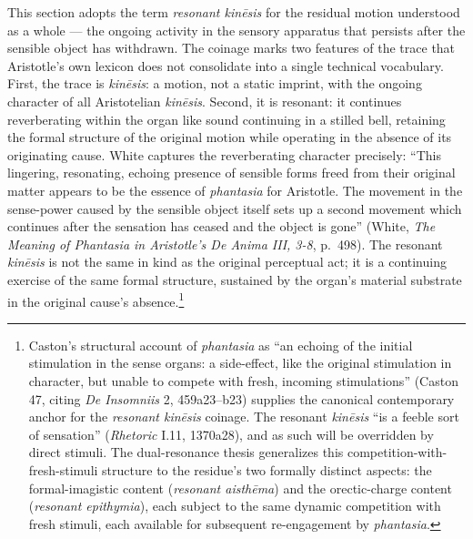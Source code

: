 \documentclass{article}
\begin{document}
This section adopts the term \textit{resonant kinēsis} for the residual motion understood as a whole --- the ongoing activity in the sensory apparatus that persists after the sensible object has withdrawn. The coinage marks two features of the trace that Aristotle's own lexicon does not consolidate into a single technical vocabulary. First, the trace is \textit{kinēsis}: a motion, not a static imprint, with the ongoing character of all Aristotelian \textit{kinēsis}. Second, it is resonant: it continues reverberating within the organ like sound continuing in a stilled bell, retaining the formal structure of the original motion while operating in the absence of its originating cause. White captures the reverberating character precisely: ``This lingering, resonating, echoing presence of sensible forms freed from their original matter appears to be the essence of \textit{phantasia} for Aristotle. The movement in the sense-power caused by the sensible object itself sets up a second movement which continues after the sensation has ceased and the object is gone'' (White, \textit{The Meaning of Phantasia in Aristotle's De Anima III, 3-8}, p.~498). The resonant \textit{kinēsis} is not the same in kind as the original perceptual act; it is a continuing exercise of the same formal structure, sustained by the organ's material substrate in the original cause's absence.\footnote{Caston's structural account of \textit{phantasia} as ``an echoing of the initial stimulation in the sense organs: a side-effect, like the original stimulation in character, but unable to compete with fresh, incoming stimulations'' (Caston 47, citing \textit{De Insomniis} 2, 459a23--b23) supplies the canonical contemporary anchor for the \textit{resonant kinēsis} coinage. The resonant \textit{kinēsis} ``is a feeble sort of sensation'' (\textit{Rhetoric} I.11, 1370a28), and as such will be overridden by direct stimuli. The dual-resonance thesis generalizes this competition-with-fresh-stimuli structure to the residue's two formally distinct aspects: the formal-imagistic content (\textit{resonant aisthēma}) and the orectic-charge content (\textit{resonant epithymia}), each subject to the same dynamic competition with fresh stimuli, each available for subsequent re-engagement by \textit{phantasia}.}
\end{document}
